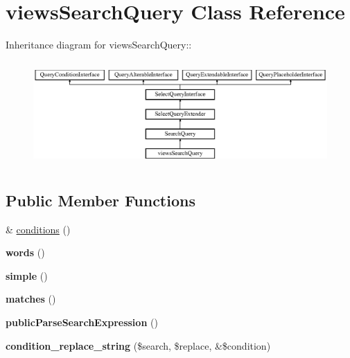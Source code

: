 \hypertarget{classviewsSearchQuery}{
\section{viewsSearchQuery Class Reference}
\label{classviewsSearchQuery}
}
Inheritance diagram for viewsSearchQuery::\begin{figure}[H]
\begin{center}
\leavevmode
\includegraphics[height=4.02299cm]{classviewsSearchQuery}
\end{center}
\end{figure}
\subsection*{Public Member Functions}
\begin{DoxyCompactItemize}
\item 
\& \hyperlink{classviewsSearchQuery_a9e059c456dbd678823b8e937be92301e}{conditions} ()
\item 
\hypertarget{classviewsSearchQuery_a21aaa6cd96d24312604fe3e0daaed96b}{
{\bfseries words} ()}
\label{classviewsSearchQuery_a21aaa6cd96d24312604fe3e0daaed96b}

\item 
\hypertarget{classviewsSearchQuery_a7f59df9f3118f5bc9de9c181991ab701}{
{\bfseries simple} ()}
\label{classviewsSearchQuery_a7f59df9f3118f5bc9de9c181991ab701}

\item 
\hypertarget{classviewsSearchQuery_ae4e6c0397175474bf55e27b201a66930}{
{\bfseries matches} ()}
\label{classviewsSearchQuery_ae4e6c0397175474bf55e27b201a66930}

\item 
\hypertarget{classviewsSearchQuery_ac35ea99a8c946881f580cd17cc6b9244}{
{\bfseries publicParseSearchExpression} ()}
\label{classviewsSearchQuery_ac35ea99a8c946881f580cd17cc6b9244}

\item 
\hypertarget{classviewsSearchQuery_a3857365d4f50db7c8f29c384272d4dea}{
{\bfseries condition\_\-replace\_\-string} (\$search, \$replace, \&\$condition)}
\label{classviewsSearchQuery_a3857365d4f50db7c8f29c384272d4dea}

\end{DoxyCompactItemize}


